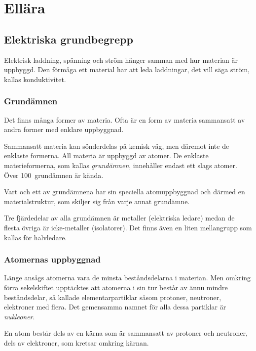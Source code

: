 \chapter{Ellära}
\label{ellära}

\section{Elektriska grundbegrepp}


Elektrisk laddning, spänning och ström hänger samman med hur materian är
uppbyggd.
Den förmåga ett material har att leda laddningar, det vill säga ström, kallas
konduktivitet.

\subsection{Grundämnen}

Det finns många former av materia.
Ofta är en form av materia sammansatt av andra former med enklare uppbyggnad.

Sammansatt materia kan sönderdelas på kemisk väg, men däremot inte de enklaste
formerna.
All materia är uppbyggd av atomer.
De enklaste materieformerna, som kallas \emph{grundämnen}, innehåller endast
ett slags atomer.
Över 100~grundämnen är kända.

Vart och ett av grundämnena har sin speciella atomuppbyggnad och därmed en
materialstruktur, som skiljer sig från varje annat grundämne.

Tre fjärdedelar av alla grundämnen är metaller (elektriska ledare) medan de
flesta övriga är icke-metaller (isolatorer).
Det finns även en liten mellangrupp som kallas för halvledare.

\subsection{Atomernas uppbyggnad}

Länge ansågs atomerna vara de minsta beståndsdelarna i materian.
Men omkring förra sekelskiftet upptäcktes att atomerna i sin tur består av ännu mindre
beståndsdelar, så kallade elementarpartiklar såsom protoner, neutroner, elektroner
med flera.
Det gemensamma namnet för alla dessa partiklar är \emph{nukleoner}.

En atom består dels av en kärna som är sammansatt av protoner och neutroner,
dels av elektroner, som kretsar omkring kärnan.

